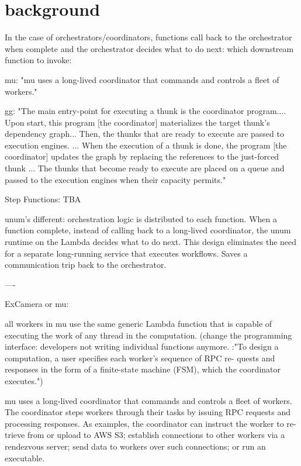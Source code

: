 \section{background}\label{sec:bg}

In the case of orchestrators/coordinators, functions call back to the
orchestrator when complete and the orchestrator decides what to do next: which
downstream function to invoke:

mu: "mu uses a long-lived coordinator that commands and controls a fleet of
workers."

gg: "The main entry-point for executing a thunk is the coordinator program....
Upon start, this program [the coordinator] materializes the target thunk's
dependency graph... Then, the thunks that are ready to execute are passed to
execution engines. ... When the execution of a thunk is done, the program [the
coordinator] updates the graph by replacing the references to the just-forced
thunk ... The thunks that become ready to execute are placed on a queue and
passed to the execution engines when their capacity permits."

Step Functions: TBA


unum's different: orchestration logic is distributed to each function. When a
function complete, instead of calling back to a long-lived coordinator, the
unum runtime on the Lambda decides what to do next. This design eliminates the
need for a separate long-running service that executes workflows. Saves a
communication trip back to the orchestrator.



----

ExCamera or mu:

all workers in mu use the same generic Lambda function that is capable of
executing the work of any thread in the computation. (change the programming
interface: developers not writing individual functions anymore. :"To design a
computation, a user specifies each worker’s sequence of RPC re- quests and
responses in the form of a finite-state machine (FSM), which the coordinator
executes.")

mu uses a long-lived coordinator that commands and controls a fleet of
workers. The coordinator steps workers through their tasks by issuing RPC
requests and processing responses. As examples, the coordinator can instruct
the worker to re- trieve from or upload to AWS S3; establish connections to
other workers via a rendezvous server; send data to workers over such
connections; or run an executable.

